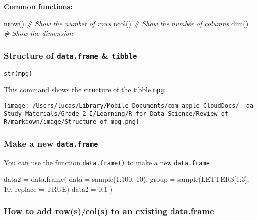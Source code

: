 \documentclass[
]{article}
\let\oldincludegraphics\includegraphics
\renewcommand{\includegraphics}[2][]{\begin{center}\oldincludegraphics[#1]{#2}\end{center}}
\newenvironment{Shaded}{}{}
\newcommand{\AttributeTok}[1]{\textcolor[rgb]{0.49,0.56,0.16}{#1}}
\newcommand{\CommentTok}[1]{\textcolor[rgb]{0.38,0.63,0.69}{\textit{#1}}}
\newcommand{\ConstantTok}[1]{\textcolor[rgb]{0.53,0.00,0.00}{#1}}
\newcommand{\DecValTok}[1]{\textcolor[rgb]{0.25,0.63,0.44}{#1}}
\newcommand{\FloatTok}[1]{\textcolor[rgb]{0.25,0.63,0.44}{#1}}
\newcommand{\FunctionTok}[1]{\textcolor[rgb]{0.02,0.16,0.49}{#1}}
\newcommand{\NormalTok}[1]{#1}
\newcommand{\OtherTok}[1]{\textcolor[rgb]{0.00,0.44,0.13}{#1}}
\newcommand{\SpecialCharTok}[1]{\textcolor[rgb]{0.25,0.44,0.63}{#1}}
\begin{document}
\textbf{Common functions:}

\begin{Shaded}
\begin{Highlighting}[]
\FunctionTok{nrow}\NormalTok{() }\CommentTok{\# Show the number of rows}
\FunctionTok{ncol}\NormalTok{() }\CommentTok{\# Show the number of columns}
\FunctionTok{dim}\NormalTok{()  }\CommentTok{\# Show the dimension}
\end{Highlighting}
\end{Shaded}

\hypertarget{structure-of-dataframe--tibble}{%
\subsubsection{\texorpdfstring{Structure of \texttt{data.frame} \&
\texttt{tibble}}{Structure of data.frame \& tibble}}\label{structure-of-dataframe--tibble}}

\texttt{str(mpg)}

This command shows the structure of the tibble \texttt{mpg}:

\texttt{[image: /Users/lucas/Library/Mobile Documents/com~apple~CloudDocs/~~aa Study Materials/Grade 2 I/Learning/R for Data Science/Review of R/markdown/image/Structure of mpg.png]}

\hypertarget{make-a-new-dataframe}{%
\subsubsection{\texorpdfstring{Make a new
\texttt{data.frame}}{Make a new data.frame}}\label{make-a-new-dataframe}}

You can use the function \texttt{data.frame()} to make a new
\texttt{data.frame}

\begin{Shaded}
\begin{Highlighting}[]
\NormalTok{data2 }\OtherTok{=}
	\FunctionTok{data.frame}\NormalTok{(}
  	\AttributeTok{data =} \FunctionTok{sample}\NormalTok{(}\DecValTok{1}\SpecialCharTok{:}\DecValTok{100}\NormalTok{, }\DecValTok{10}\NormalTok{),}
    \AttributeTok{group =} \FunctionTok{sample}\NormalTok{(LETTERS[}\DecValTok{1}\SpecialCharTok{:}\DecValTok{3}\NormalTok{], }\DecValTok{10}\NormalTok{, }\AttributeTok{replace =} \ConstantTok{TRUE}\NormalTok{)}
    \AttributeTok{data2 =} \FloatTok{0.1}
\NormalTok{  )}
\end{Highlighting}
\end{Shaded}

\hypertarget{how-to-add-rowscols-to-an-existing-dataframe}{%
\subsubsection{How to add row(s)/col(s) to an existing
data.frame}\label{how-to-add-rowscols-to-an-existing-dataframe}}
\end{document}
